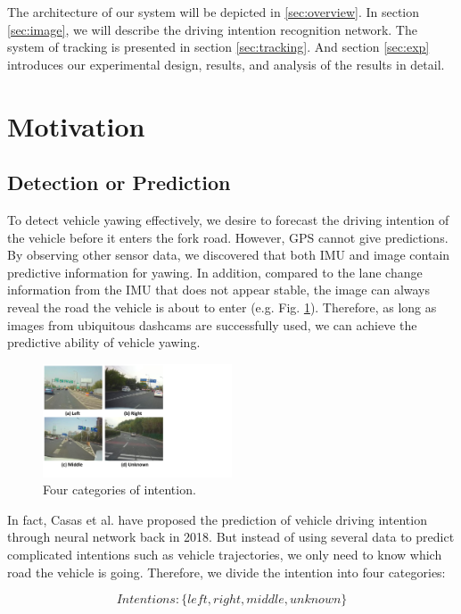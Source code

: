 \documentclass[journal]{IEEEtran}
\begin{document}
The architecture of our system will be depicted in \ref{sec:overview}.
In section \ref{sec:image}, we will describe the driving intention recognition network.
The system of tracking is presented in section \ref{sec:tracking}.
And section \ref{sec:exp} introduces our experimental design, results, and analysis of the results in detail.

\section{Motivation}

\subsection{Detection or Prediction}
To detect vehicle yawing effectively, we desire to forecast the driving intention of the vehicle before it enters the fork road. However, GPS cannot give predictions. By observing other sensor data, we discovered that both IMU and image contain predictive information for yawing. In addition, compared to the lane change information from the IMU that does not appear stable, the image can always reveal the road the vehicle is about to enter (e.g. Fig. \ref{fig:intent}). Therefore, as long as images from ubiquitous dashcams are successfully used, we can achieve the predictive ability of vehicle yawing.

\begin{figure}[htbp]
    \centerline{\includegraphics[width=0.5\textwidth]{fig/intention.pdf}}
    \caption{Four categories of intention.}
    \label{fig:intent}
\end{figure}

In fact, Casas et al. \cite{casas2018intentnet} have proposed the prediction of vehicle driving intention through neural network back in 2018. But instead of using several data to predict complicated intentions such as vehicle trajectories, we only need to know which road the vehicle is going. Therefore, we divide the intention into four categories: 

    $$Intentions: \{ left, right, middle, unknown\}$$
\end{document}
